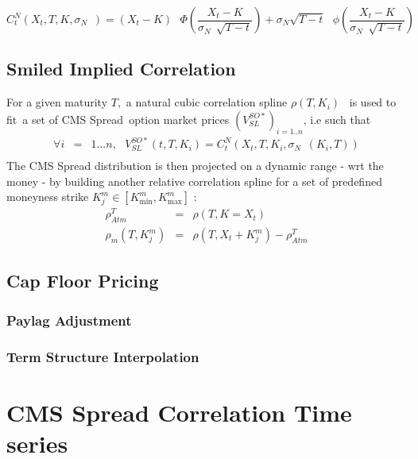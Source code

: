 \documentclass[3pt]{article}
\begin{document}
\begin{equation*}
C_{t}^{N}(X_{t},T,K,\sigma _{N\text{ }})=\left( X_{t}-K\right) \text{ }\Phi
\left( \frac{X_{t}-K}{\sigma _{N\text{ }}\sqrt{T-t}}\right) +\sigma _{N\text{
}}\sqrt{T-t}\text{ }\phi \left( \frac{X_{t}-K}{\sigma _{N\text{ }}\sqrt{T-t}}%
\right) 
\end{equation*}

\subsection{Smiled Implied Correlation}

For a given maturity $T,$ a natural cubic correlation spline $\rho (T,K_{i})$%
\ is used to fit\ a set of CMS Spread\ option market prices $\left(
V_{SL}^{SO\ast }\right) _{i=1..n}$, i.e such that 
\begin{eqnarray*}
\forall i &=&1...n,\text{ \ }V_{SL}^{SO\ast
}(t,T,K_{i})=C_{t}^{N}(X_{t},T,K_{i},\sigma _{N\text{ }}(K_{i},T)) \\
&&
\end{eqnarray*}%
The CMS Spread distribution is then projected on a dynamic range - wrt the
money - by building another relative correlation spline for a set of
predefined moneyness strike $K_{j}^{m}\in \left[ K_{\min }^{m},K_{\max }^{m}%
\right] $ : 
\begin{eqnarray*}
\rho _{Atm}^{T} &=&\rho (T,K=X_{t}) \\
\rho _{m}(T,K_{j}^{m}) &=&\rho (T,X_{t}+K_{j}^{m})-\rho _{Atm}^{T}
\end{eqnarray*}

\subsection{Cap Floor Pricing}

\subsubsection{Paylag Adjustment}

\bigskip 

\subsubsection{Term Structure Interpolation}

\section{CMS Spread Correlation Time series}
\end{document}
